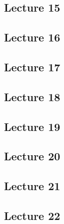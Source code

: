 \documentclass{article}
\begin{document}
\subsection{Lecture 15}

\subsection{Lecture 16}

\subsection{Lecture 17}

\subsection{Lecture 18}

\subsection{Lecture 19}

\subsection{Lecture 20}

\subsection{Lecture 21}

\subsection{Lecture 22}
\end{document}
